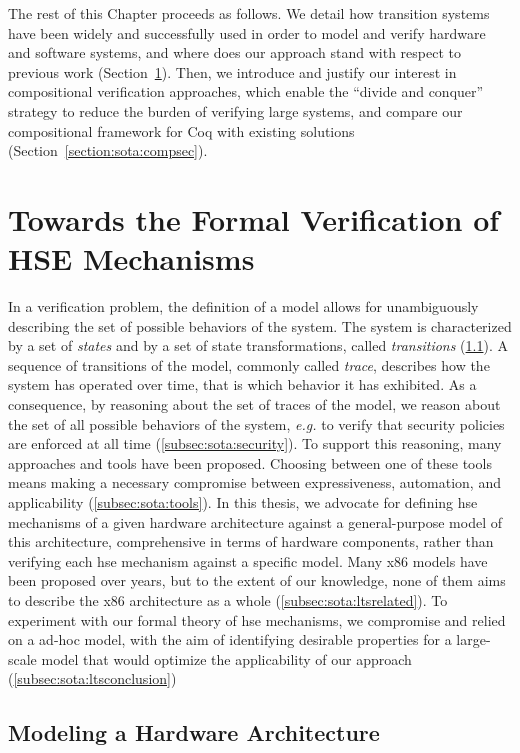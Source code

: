 The rest of this Chapter proceeds as follows.
%
We detail how transition systems have been widely and successfully used in order
to model and verify hardware and software systems, and where does our 
approach 
stand with respect to previous work (Section~\ref{sec:sota:formalisms}).
%
Then, we introduce and justify our interest in compositional verification
approaches, which enable the ``divide and conquer'' strategy to reduce the
burden of verifying large systems, and compare our compositional framework for
Coq with existing solutions (Section~\ref{section:sota:compsec}).

\section{Towards the Formal Verification of HSE Mechanisms}
\label{sec:sota:formalisms}

In a verification problem, the definition of a model allows for unambiguously
describing the set of possible behaviors of the system.
%
The system is characterized by a set of \emph{states} and by a set of state
transformations, called \emph{transitions} (\ref{subsec:sota:ltsdef}).
%
A sequence of transitions of the model, commonly called \emph{trace}, describes
how the system has operated over time, that is which behavior it has exhibited.
%
As a consequence, by reasoning about the set of traces of the model, we reason
about the set of all possible behaviors of the system, \emph{e.g.} to verify
that security policies are enforced at all time (\ref{subsec:sota:security}).
%
To support this reasoning, many approaches and tools have
been proposed. Choosing between one of these tools means making a necessary
compromise between expressiveness, automation, and applicability
(\ref{subsec:sota:tools}).
%
In this thesis, we advocate for defining \ac{hse} mechanisms of a given hardware
architecture against a general-purpose model of this architecture, comprehensive
in terms of hardware components, rather than verifying each \ac{hse} mechanism
against a specific model.
%
Many x86 models have been proposed over years, but to the extent of our
knowledge, none of them aims to describe the x86 architecture as a whole
(\ref{subsec:sota:ltsrelated}).
%
To experiment with our formal theory of \ac{hse} mechanisms, we compromise
and relied on a ad-hoc model, with the aim of identifying desirable properties
for a large-scale model that would optimize the applicability of our approach
(\ref{subsec:sota:ltsconclusion})

\subsection{Modeling a Hardware Architecture}
\label{subsec:sota:ltsdef}

